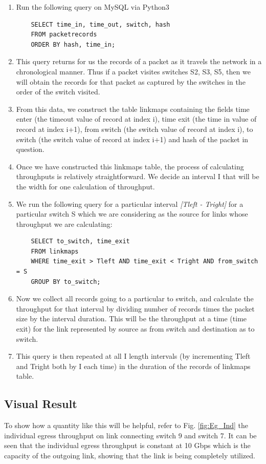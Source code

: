 \begin{enumerate}
    \item Run the following query on MySQL via Python3
    \begin{verbatim}
    SELECT time_in, time_out, switch, hash
    FROM packetrecords
    ORDER BY hash, time_in;
    \end{verbatim}
    \item This query returns for us the records of a packet as it travels the network in a chronological manner. Thus if a packet visites switches S2, S3, S5, then we will
    obtain the records for that packet as captured by the switches in the order of the switch visited.
    \item From this data, we construct the table linkmaps containing the fields time enter (the timeout value of record at index i), time exit (the time in value of record at index i+1), from switch
    (the switch value of record at index i), to switch (the switch value of record at index i+1) and hash of the packet in question.
    \item Once we have constructed this linkmaps table, the process of calculating throughputs is relatively straightforward. We decide an interval I that will be the width for
    one calculation of throughput.
    \item We run the following query for a particular interval \emph{[Tleft - Tright]} for a particular switch S which we are considering as the source for links whose throughput we are calculating:
    \begin{verbatim}
    SELECT to_switch, time_exit 
    FROM linkmaps
    WHERE time_exit > Tleft AND time_exit < Tright AND from_switch = S
    GROUP BY to_switch;
    \end{verbatim}
    \item Now we collect all records going to a particular to switch, and calculate the throughput for that interval by dividing number of records times the packet size by the interval duration.
    This will be the throughput at a time (time exit) for the link represented by source as from switch and destination as to switch.
    \item This query is then repeated at all I length intervals (by incrementing Tleft and Tright both by I each time) in the duration of the records of linkmaps table.
\end{enumerate}

\subsection{Visual Result}
To show how a quantity like this will be helpful, refer to Fig. \ref{fig:Eg_Ind} the individual egress throughput on link connecting switch 9 and switch 7. It can be seen that the individual
egress throughput is constant at 10 Gbps which is the capacity of the outgoing link, showing that the link is being completely utilized.

